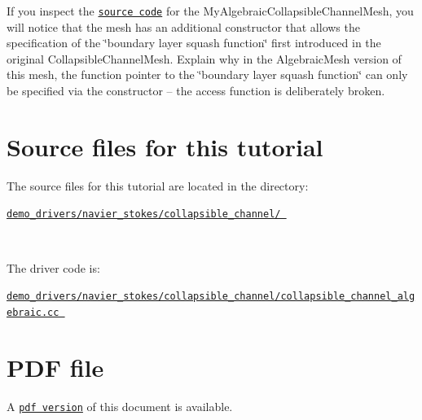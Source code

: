 \begin{DoxyEnumerate}
\item If you inspect the \href{../../../../demo_drivers/navier_stokes/collapsible_channel/my_alg_channel_mesh.h}{\tt source code} for the {\ttfamily My\+Algebraic\+Collapsible\+Channel\+Mesh}, you will notice that the mesh has an additional constructor that allows the specification of the \char`\"{}boundary layer squash function\char`\"{} first introduced in the original {\ttfamily Collapsible\+Channel\+Mesh}. Explain why in the {\ttfamily Algebraic\+Mesh} version of this mesh, the function pointer to the \char`\"{}boundary layer
   squash function\char`\"{} can only be specified via the constructor -- the access function is deliberately broken.
\end{DoxyEnumerate}



 

\hypertarget{index_sources}{}\section{Source files for this tutorial}\label{index_sources}

\begin{DoxyItemize}
\item The source files for this tutorial are located in the directory\+:~\newline
~\newline
\begin{center} \href{../../../../demo_drivers/navier_stokes/collapsible_channel/}{\tt demo\+\_\+drivers/navier\+\_\+stokes/collapsible\+\_\+channel/ } \end{center} ~\newline

\item The driver code is\+: ~\newline
~\newline
\begin{center} \href{../../../../demo_drivers/navier_stokes/collapsible_channel/collapsible_channel_algebraic.cc}{\tt demo\+\_\+drivers/navier\+\_\+stokes/collapsible\+\_\+channel/collapsible\+\_\+channel\+\_\+algebraic.\+cc } \end{center} 
\end{DoxyItemize}

 

 \hypertarget{index_pdf}{}\section{P\+D\+F file}\label{index_pdf}
A \href{../latex/refman.pdf}{\tt pdf version} of this document is available. 
